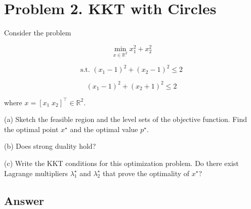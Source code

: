 \documentclass[
	12pt,
]{fphw}
\begin{document}
\newpage
\section*{Problem 2. KKT with Circles}

Consider the problem

\[
\min_{x \in \mathbb{R}^2} x_1^2 + x_2^2
\tag{11}
\]

\[
\text{s.t. } (x_1 - 1)^2 + (x_2 - 1)^2 \le 2
\tag{12}
\]

\[
(x_1 - 1)^2 + (x_2 + 1)^2 \le 2
\tag{13}
\]

where \(x = [x_1\; x_2]^\top \in \mathbb{R}^2\).

(a) Sketch the feasible region and the level sets of the objective function.
Find the optimal point \(x^\star\) and the optimal value \(p^\star\).

(b) Does strong duality hold?

(c) Write the KKT conditions for this optimization problem.
Do there exist Lagrange multipliers \(\lambda_1^\star\) and \(\lambda_2^\star\) that prove the optimality of \(x^\star\)?

\subsection*{Answer}
\end{document}
